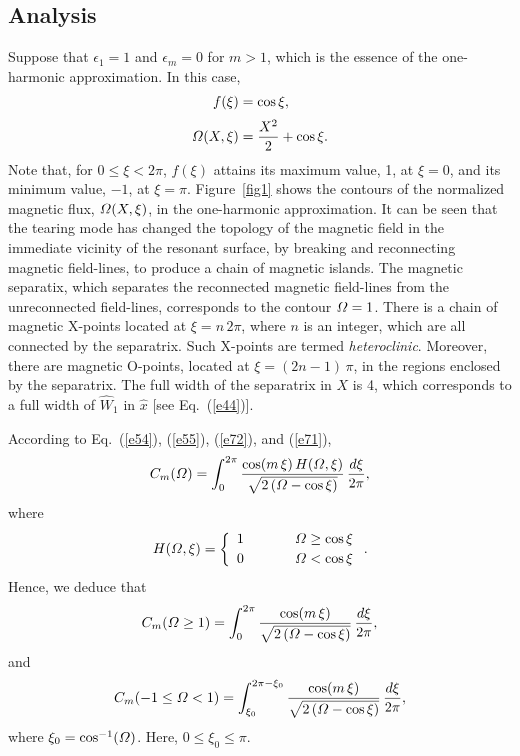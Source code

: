 \documentclass[12pt,prb,aps]{revtex4-1}
\begin{document}
\subsection{Analysis}
Suppose that $\epsilon_1=1$ and $\epsilon_m=0$ for $m>1$, which is the essence of the one-harmonic approximation.  In this case,
\begin{align}
f(\xi) &= \cos\xi,\label{e71}\\[0.5ex]
{\mit\Omega}(X,\xi) &= \frac{X^2}{2}+\cos\xi.
\end{align}
Note that, for $0\leq \xi < 2\pi$, $f(\xi)$ attains its maximum value, 1, at $\xi=0$, and its minimum value, $-1$, at $\xi=\pi$. 
Figure~\ref{fig1} shows the contours of the normalized magnetic flux, ${\mit\Omega}(X,\xi)$, in the one-harmonic approximation. It can be seen that the tearing mode has changed the
topology of the magnetic field in the immediate vicinity of the resonant surface, by breaking and reconnecting magnetic field-lines,  to produce a chain of magnetic islands. The magnetic
separatix, which separates the reconnected magnetic field-lines from the unreconnected field-lines, corresponds to
the contour ${\mit\Omega}=1$. There is a chain of magnetic
X-points located at $\xi=n\,2\pi$, where $n$ is an integer, which are all connected by the separatrix.
 Such X-points are termed {\em heteroclinic}.  Moreover, there are magnetic O-points, located at $\xi=(2n-1)\,\pi$, in the regions enclosed by the separatrix. The full width of the separatrix in $X$ is 4, which corresponds to a full width
of $\hat{W}_1$ in $\hat{x}$ [see Eq.~(\ref{e44})]. 

According to Eq.~(\ref{e54}), (\ref{e55}), (\ref{e72}), and (\ref{e71}), 
\begin{equation}
 C_m({\mit\Omega})= \int_{0}^{2\pi}\frac{\cos(m\,\xi)\,H({\mit\Omega},\xi)}
 {\sqrt{2\left({\mit\Omega}-\cos\xi\right)}}\,\frac{d\xi}{2\pi},
 \end{equation}
 where
 \begin{equation}
 H({\mit\Omega},\xi) = \left\{
 \begin{array}{ccc} 1&~~~~~&{\mit\Omega}\geq \cos\xi\\[0.5ex]
 0 &&{\mit\Omega}< \cos\xi\end{array}\right..
 \end{equation}
 Hence, we deduce that
 \begin{equation}
 C_m({\mit\Omega}\geq 1)= \int_{0}^{2\pi}\frac{\cos(m\,\xi)}
 {\sqrt{2\left({\mit\Omega}-\cos\xi\right)}}\,\frac{d\xi}{2\pi},
\end{equation}
and 
 \begin{equation}
C_m(-1\leq {\mit\Omega}<1)= \int_{\xi_0}^{2\pi-\xi_0}\frac{\cos(m\,\xi)}
 {\sqrt{2\left({\mit\Omega}-\cos\xi\right)}}\,\frac{d\xi}{2\pi}, 
\end{equation}
 where
$\xi_0=\cos^{-1}({\mit\Omega})$. 
Here, $0\leq \xi_0\leq \pi$. 
\end{document}

